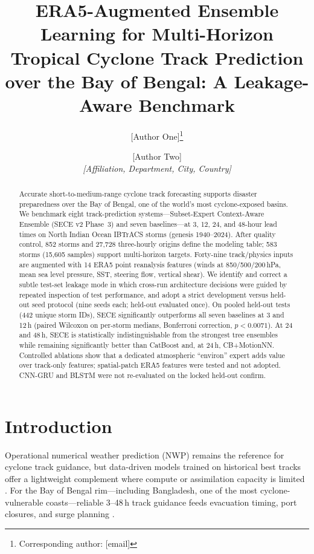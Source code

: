 \documentclass[11pt]{article}
\title{ERA5-Augmented Ensemble Learning for Multi-Horizon Tropical Cyclone Track Prediction over the Bay of Bengal: A Leakage-Aware Benchmark}
\author{[Author One]\thanks{Corresponding author: [email]} \and [Author Two]\\
\textit{[Affiliation, Department, City, Country]}}
\date{}
\newcommand{\sece}{SECE}
\newcommand{\secefull}{Subset-Expert Context-Aware Ensemble (\sece{} v2 Phase~3)}
\newcommand{\bob}{Bay of Bengal}
\newcommand{\era}{ERA5}
\newcommand{\ibtracs}{IBTrACS}
\newcommand{\bonf}{0.0071}
\begin{document}
\maketitle

\begin{abstract}
Accurate short-to-medium-range cyclone track forecasting supports disaster preparedness over the \bob{}, one of the world's most cyclone-exposed basins.
We benchmark eight track-prediction systems---\secefull{} and seven baselines---at 3, 12, 24, and 48-hour lead times on North Indian Ocean \ibtracs{} storms (genesis 1940--2024).
After quality control, 852 storms and 27{,}728 three-hourly origins define the modeling table; 583 storms (15{,}605 samples) support multi-horizon targets.
Forty-nine track/physics inputs are augmented with 14 \era{} point reanalysis features (winds at 850/500/200\,hPa, mean sea level pressure, SST, steering flow, vertical shear).
We identify and correct a subtle test-set leakage mode in which cross-run architecture decisions were guided by repeated inspection of test performance, and adopt a strict development versus held-out seed protocol (nine seeds each; held-out evaluated once).
On pooled held-out tests (442 unique storm IDs), \sece{} significantly outperforms all seven baselines at 3 and 12\,h (paired Wilcoxon on per-storm medians, Bonferroni correction, $p<\bonf$).
At 24 and 48\,h, \sece{} is statistically indistinguishable from the strongest tree ensembles while remaining significantly better than CatBoost and, at 24\,h, CB+MotionNN.
Controlled ablations show that a dedicated atmospheric ``environ'' expert adds value over track-only features; spatial-patch \era{} features were tested and not adopted.
CNN-GRU and BLSTM were not re-evaluated on the locked held-out confirm.
\end{abstract}

\section{Introduction}
\label{sec:intro}

Operational numerical weather prediction (NWP) remains the reference for cyclone track guidance, but data-driven models trained on historical best tracks offer a lightweight complement where compute or assimilation capacity is limited \cite{demaria2013,goerss2000}.
For the \bob{} rim---including Bangladesh, one of the most cyclone-vulnerable coasts---reliable 3--48\,h track guidance feeds evacuation timing, port closures, and surge planning \cite{paul2010,mohapatra2015,emanuel2005}.
\end{document}
